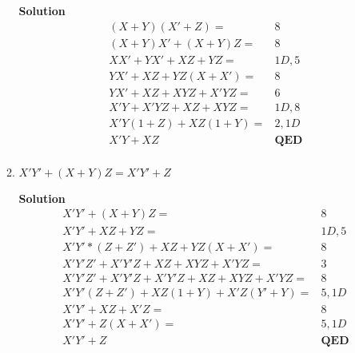 \begin{enumerate}
\begin{enumerate}
                                \begin{onlysolution}  \textbf{Solution}
                                    \begin{align*}
                                        &(X+Y)(X'+Z) =             & 8     \\
                                        &(X+Y)X' + (X+Y)Z =        & 8     \\
                                        &XX' + YX' + XZ + YZ =     & 1D,5  \\
                                        &YX' + XZ + YZ(X+X') =     & 8     \\
                                        &YX' + XZ + XYZ + X'YZ =   & 6     \\
                                        &X'Y + X'YZ + XZ + XYZ =   & 1D, 8 \\
                                        &X'Y(1+Z) + XZ(1+Y) =      & 2, 1D \\
                                        &X'Y + XZ                  & \textbf{{QED}}   \\
                                    \end{align*}
                                \end{onlysolution}
                                \filbreak
                            \item $X'Y' + (X+Y)Z = X'Y' + Z$

                                \begin{onlysolution}  \textbf{Solution}
                                    \begin{align*}
                                        &X'Y' + (X+Y)Z =                                & 8\\
                                        &X'Y' + XZ + YZ =                               & 1D,5 \\
                                        &X'Y'*(Z+Z') + XZ + YZ(X+X') =                  & 8 \\
                                        &X'Y'Z' + X'Y'Z + XZ + XYZ + X'YZ =             & 3 \\
                                        &X'Y'Z' + X'Y'Z + X'Y'Z + XZ + XYZ + X'YZ =     & 8 \\
                                        &X'Y'(Z+Z') + XZ(1+Y) + X'Z(Y'+Y) =             & 5,1D \\
                                        &X'Y' + XZ + X'Z  =                             & 8 \\
                                        &X'Y' + Z(X+X') =                               & 5, 1D\\
                                        &X'Y' + Z                                       & \textbf{{QED}} \\
                                    \end{align*}
                                \end{onlysolution}


\end{enumerate}
\end{enumerate}

